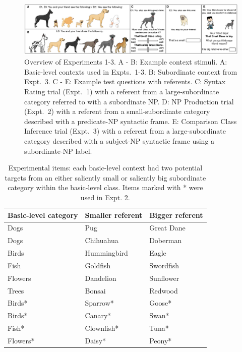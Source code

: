 \documentclass[10pt,letterpaper]{article}
\begin{document}
\begin{figure}[t]
\begin{center}
\includegraphics[width=\textwidth]{screenshots.pdf}
\end{center}
\caption{Overview of Experiments 1-3. A - B: Example context stimuli. A: Basic-level contexts used in Expts.~1-3. B: Subordinate context from Expt.~3. C - E: Example test questions with referents. C: Syntax Rating trial (Expt.~1) with a referent from a large-subordinate category referred to with a subordinate NP. D: NP Production trial (Expt.~2) with a referent from a small-subordinate category described with a predicate-NP syntactic frame. E: Comparison Class Inference trial (Expt.~3) with a referent from a large-subordinate category described with a subject-NP syntactic frame using a subordinate-NP label.} 
\label{screenshots}
\end{figure}
\begin{table}[t]
\small{
\begin{center}
\caption{Experimental items: each basic-level context had two potential targets from an either saliently small or saliently big subordinate category within the basic-level class. Items marked with * were used in Expt. 2.}
\label{tab:stimuli}
\vskip 0.12in
\fontsize{10}{11}\selectfont
\begin{tabularx}{\linewidth}{lll}
\hline
 Basic-level category & Smaller referent & Bigger referent\\
\hline
 Dogs & Pug & Great Dane \\
 Dogs & Chihuahua & Doberman\\
 Birds & Hummingbird & Eagle  \\
 Fish & Goldfish & Swordfish \\
 Flowers & Dandelion & Sunflower\\
 Trees & Bonsai & Redwood\\
Birds* & Sparrow* & Goose* \\
Birds* & Canary* & Swan* \\
Fish* & Clownfish* & Tuna* \\
Flowers* & Daisy* & Peony* \\
\hline     
\end{tabularx}
\end{center}
}
\end{table}
\end{document}
